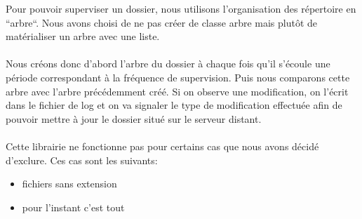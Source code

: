 Pour pouvoir superviser un dossier, nous utilisons l'organisation des répertoire en ``arbre``.
Nous avons choisi de ne pas créer de classe arbre mais plutôt de matérialiser un arbre avec une liste.\\
\\
Nous créons donc d'abord l'arbre du dossier à chaque fois qu'il s'écoule une période correspondant à la fréquence de supervision. 
Puis nous comparons cette arbre avec l'arbre précédemment créé. 
Si on observe une modification, on l'écrit dans le fichier de log et on va signaler le type de modification effectuée afin de pouvoir mettre à jour le dossier situé sur le serveur distant.\\
\\
Cette librairie ne fonctionne pas pour certains cas que nous avons décidé d'exclure. Ces cas sont les suivants:
\begin{itemize}
\item fichiers sans extension
\item pour l'instant c'est tout
\end{itemize}



